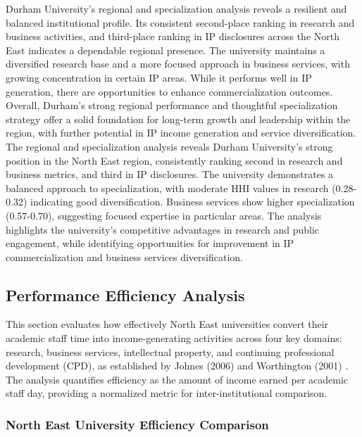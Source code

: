 \documentclass[journal,onecolumn, 10pt,draftclsnofoot]{IEEEtran}
\begin{document}
Durham University's regional and specialization analysis reveals a resilient and balanced institutional profile. Its consistent second-place ranking in research and business activities, and third-place ranking in IP disclosures across the North East indicates a dependable regional presence. The university maintains a diversified research base and a more focused approach in business services, with growing concentration in certain IP areas. While it performs well in IP generation, there are opportunities to enhance commercialization outcomes. Overall, Durham's strong regional performance and thoughtful specialization strategy offer a solid foundation for long-term growth and leadership within the region, with further potential in IP income generation and service diversification. The regional and specialization analysis reveals Durham University's strong position in the North East region, consistently ranking second in research and business metrics, and third in IP disclosures. The university demonstrates a balanced approach to specialization, with moderate HHI values in research (0.28-0.32) indicating good diversification. Business services show higher specialization (0.57-0.70), suggesting focused expertise in particular areas. The analysis highlights the university's competitive advantages in research and public engagement, while identifying opportunities for improvement in IP commercialization and business services diversification.

\subsection{Performance Efficiency Analysis}
\label{sec:performance-efficiency}

This section evaluates how effectively North East universities convert their academic staff time into income-generating activities across four key domains: research, business services, intellectual property, and continuing professional development (CPD), as established by Johnes (2006) \cite{johnes2006data} and Worthington (2001) \cite{worthington2001empirical}. The analysis quantifies efficiency as the amount of income earned per academic staff day, providing a normalized metric for inter-institutional comparison.

\subsubsection{North East University Efficiency Comparison}
\end{document}
